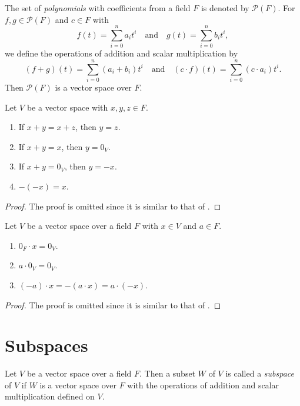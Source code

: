 \begin{example}
  The set of \emph{polynomials} with coefficients from a field $F$ is denoted
  by $\mathcal{P}(F)$.
  For $f, g \in \mathcal{P}(F)$ and $c \in F$ with
  \begin{equation*}
    f(t) = \sum_{i=0}^n a_it^i
    \quad \text{and} \quad
    g(t) = \sum_{i=0}^n b_it^i,
  \end{equation*}
  we define the operations of addition and scalar multiplication by
  \begin{equation*}
    (f + g)(t) = \sum_{i=0}^n (a_i + b_i)t^i
    \quad \text{and} \quad
    (c \cdot f)(t) = \sum_{i=0}^n (c \cdot a_i)t^i.
  \end{equation*}
  Then $\mathcal{P}(F)$ is a vector space over $F$.
\end{example}

\begin{proposition}\label{prop:vector-space-addition}
  Let $V$ be a vector space with $x, y, z \in F$.
  \begin{enumerate}
    \item If $x + y = x + z$, then $y = z$.
    \item If $x + y = x$, then $y = 0_V$.
    \item If $x + y = 0_V$, then $y = -x$.
    \item $-(-x) = x$.
  \end{enumerate}
\end{proposition}
\begin{proof}
  The proof is omitted since it is similar to that of
  .
\end{proof}

\begin{proposition}\label{prop:vector-space-operation}
  Let $V$ be a vector space over a field $F$ with $x \in V$ and $a \in F$.
  \begin{enumerate}
    \item $0_F \cdot x = 0_V$.
    \item $a \cdot 0_V = 0_V$.
    \item $(-a) \cdot x = -(a \cdot x) = a \cdot (-x)$.
  \end{enumerate}
\end{proposition}
\begin{proof}
  The proof is omitted since it is similar to that of
  .
\end{proof}

\section{Subspaces}
\begin{definition}\label{def:subspace}
  Let $V$ be a vector space over a field $F$.
  Then a subset $W$ of $V$ is called a \emph{subspace} of $V$ if $W$ is a
  vector space over $F$ with the operations of addition and scalar
  multiplication defined on $V$.
\end{definition}

